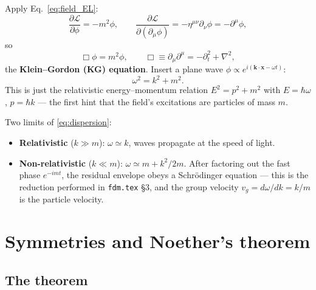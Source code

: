 \documentclass[12pt]{article}
\newcommand{\bk}{\mathbf{k}}
\newcommand{\bx}{\mathbf{x}}
\newcommand{\Lag}{\mathcal{L}}
\begin{document}
Apply Eq.~\eqref{eq:field_EL}:
%
\begin{equation}
  \frac{\partial\Lag}{\partial\phi} = -m^2\phi,
  \qquad
  \frac{\partial\Lag}{\partial(\partial_\mu\phi)}
    = -\eta^{\mu\nu}\partial_\nu\phi = -\partial^\mu\phi,
\end{equation}
%
so
%
\begin{equation}
  \Box\phi = m^2\phi,
  \qquad
  \Box \equiv \partial_\mu\partial^\mu = -\partial_t^2 + \nabla^2,
  \label{eq:KG_flat}
\end{equation}
%
the \textbf{Klein--Gordon (KG) equation}.  Insert a plane wave
$\phi \propto e^{i(\bk\cdot\bx - \omega t)}$:
%
\begin{equation}
  \omega^2 = k^2 + m^2.
  \label{eq:dispersion}
\end{equation}
%
This is just the relativistic energy--momentum relation
$E^2 = p^2 + m^2$ with $E=\hbar\omega$, $p=\hbar k$ --- the first
hint that the field's excitations are particles of mass $m$.

Two limits of \eqref{eq:dispersion}:
%
\begin{itemize}
  \item \textbf{Relativistic} ($k \gg m$): $\omega \simeq k$, waves
        propagate at the speed of light.
  \item \textbf{Non-relativistic} ($k \ll m$):
        $\omega \simeq m + k^2/2m$.  After factoring out the fast
        phase $e^{-imt}$, the residual envelope obeys a
        Schr\"odinger equation --- this is the reduction performed in
        \texttt{fdm.tex} \S3, and the group velocity
        $v_g = d\omega/dk = k/m$ is the particle velocity.
\end{itemize}

\section{Symmetries and Noether's theorem}
\label{sec:noether}

\subsection{The theorem}
\label{sec:noether_thm}
\end{document}
